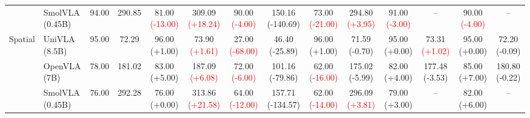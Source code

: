 \begin{table}[t]
{\begin{tabular}{llcccccccccccc}
 & SmolVLA (0.45B) & 94.00 & 290.85 & 81.00 {\scriptsize\textcolor{red}{(-13.00)}} & 309.09 {\scriptsize\textcolor{red}{(+18.24)}} & 90.00 {\scriptsize\textcolor{red}{(-4.00)}} & 150.16 {\scriptsize\textcolor{green!50!black}{(-140.69)}} & 73.00 {\scriptsize\textcolor{red}{(-21.00)}} & 294.80 {\scriptsize\textcolor{red}{(+3.95)}} & 91.00 {\scriptsize\textcolor{red}{(-3.00)}} & -- & 90.00 {\scriptsize\textcolor{red}{(-4.00)}} & -- \\
\cmidrule(lr){1-14}
\multirow{3}{*}{Spatial} & UniVLA (8.5B) & 95.00 & 72.29 & 96.00 {\scriptsize\textcolor{green!50!black}{(+1.00)}} & 73.90 {\scriptsize\textcolor{red}{(+1.61)}} & 27.00 {\scriptsize\textcolor{red}{(-68.00)}} & 46.40 {\scriptsize\textcolor{green!50!black}{(-25.89)}} & 96.00 {\scriptsize\textcolor{green!50!black}{(+1.00)}} & 71.59 {\scriptsize\textcolor{green!50!black}{(-0.70)}} & 95.00 {\scriptsize\textcolor{green!50!black}{(+0.00)}} & 73.31 {\scriptsize\textcolor{red}{(+1.02)}} & 95.00 {\scriptsize\textcolor{green!50!black}{(+0.00)}} & 72.20 {\scriptsize\textcolor{green!50!black}{(-0.09)}} \\
 & OpenVLA (7B) & 78.00 & 181.02 & 83.00 {\scriptsize\textcolor{green!50!black}{(+5.00)}} & 187.09 {\scriptsize\textcolor{red}{(+6.08)}} & 72.00 {\scriptsize\textcolor{red}{(-6.00)}} & 101.16 {\scriptsize\textcolor{green!50!black}{(-79.86)}} & 62.00 {\scriptsize\textcolor{red}{(-16.00)}} & 175.02 {\scriptsize\textcolor{green!50!black}{(-5.99)}} & 82.00 {\scriptsize\textcolor{green!50!black}{(+4.00)}} & 177.48 {\scriptsize\textcolor{green!50!black}{(-3.53)}} & 85.00 {\scriptsize\textcolor{green!50!black}{(+7.00)}} & 180.80 {\scriptsize\textcolor{green!50!black}{(-0.22)}} \\
 & SmolVLA (0.45B) & 76.00 & 292.28 & 76.00 {\scriptsize\textcolor{green!50!black}{(+0.00)}} & 313.86 {\scriptsize\textcolor{red}{(+21.58)}} & 64.00 {\scriptsize\textcolor{red}{(-12.00)}} & 157.71 {\scriptsize\textcolor{green!50!black}{(-134.57)}} & 62.00 {\scriptsize\textcolor{red}{(-14.00)}} & 296.09 {\scriptsize\textcolor{red}{(+3.81)}} & 79.00 {\scriptsize\textcolor{green!50!black}{(+3.00)}} & -- & 82.00 {\scriptsize\textcolor{green!50!black}{(+6.00)}} & -- \\
\bottomrule
\end{tabular}%
}
\end{table}
